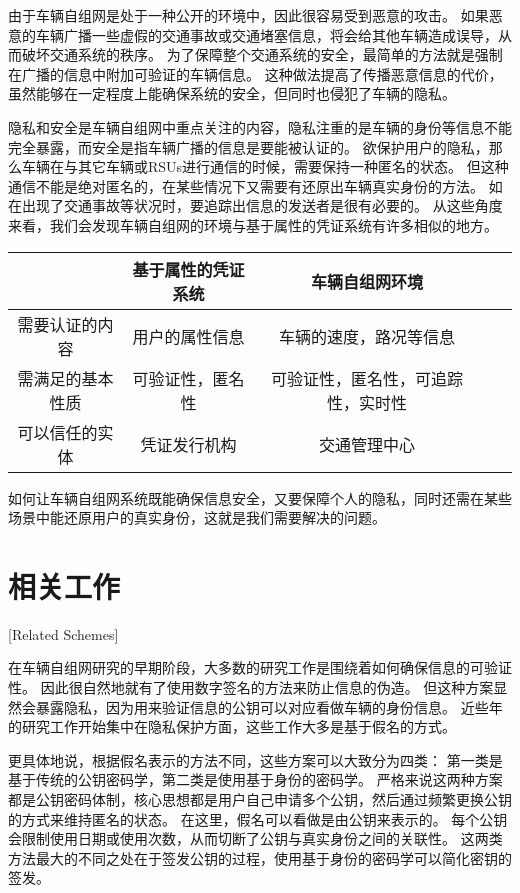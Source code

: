 由于车辆自组网是处于一种公开的环境中，因此很容易受到恶意的攻击。
如果恶意的车辆广播一些虚假的交通事故或交通堵塞信息，将会给其他车辆造成误导，从而破坏交通系统的秩序。
为了保障整个交通系统的安全，最简单的方法就是强制在广播的信息中附加可验证的车辆信息。
这种做法提高了传播恶意信息的代价，虽然能够在一定程度上能确保系统的安全，但同时也侵犯了车辆的隐私。

隐私和安全是车辆自组网中重点关注的内容，隐私注重的是车辆的身份等信息不能完全暴露，而安全是指车辆广播的信息是要能被认证的。
欲保护用户的隐私，那么车辆在与其它车辆或RSUs进行通信的时候，需要保持一种匿名的状态。
但这种通信不能是绝对匿名的，在某些情况下又需要有还原出车辆真实身份的方法。
如在出现了交通事故等状况时，要追踪出信息的发送者是很有必要的。
从这些角度来看，我们会发现车辆自组网的环境与基于属性的凭证系统有许多相似的地方。

\begin{table}[htbp]
\vspace{0.5em}\centering\wuhao
\begin{tabular}{ccccc}
\toprule[1.5pt]
 & 基于属性的凭证系统 & 车辆自组网环境 \\
\midrule[1pt]
 需要认证的内容 & 用户的属性信息 & 车辆的速度，路况等信息 \\
 需满足的基本性质 & 可验证性，匿名性 & 可验证性，匿名性，可追踪性，实时性 \\
 可以信任的实体 & 凭证发行机构 & 交通管理中心 \\ 
\bottomrule[1.5pt]
\end{tabular}
\end{table}

如何让车辆自组网系统既能确保信息安全，又要保障个人的隐私，同时还需在某些场景中能还原用户的真实身份，这就是我们需要解决的问题。

\section{相关工作}[Related Schemes]

在车辆自组网研究的早期阶段，大多数的研究工作是围绕着如何确保信息的可验证性。
因此很自然地就有了使用数字签名的方法来防止信息的伪造\cite{el2002security}。
但这种方案显然会暴露隐私，因为用来验证信息的公钥可以对应看做车辆的身份信息\cite{petit2015pseudonym}。
近些年的研究工作开始集中在隐私保护方面，这些工作大多是基于假名的方式。

更具体地说，根据假名表示的方法不同，这些方案可以大致分为四类\cite{petit2015pseudonym}：
第一类是基于传统的公钥密码学，第二类是使用基于身份的密码学。
严格来说这两种方案都是公钥密码体制，核心思想都是用户自己申请多个公钥，然后通过频繁更换公钥的方式来维持匿名的状态。
在这里，假名可以看做是由公钥来表示的。
每个公钥会限制使用日期或使用次数，从而切断了公钥与真实身份之间的关联性。
这两类方法最大的不同之处在于签发公钥的过程，使用基于身份的密码学可以简化密钥的签发。

